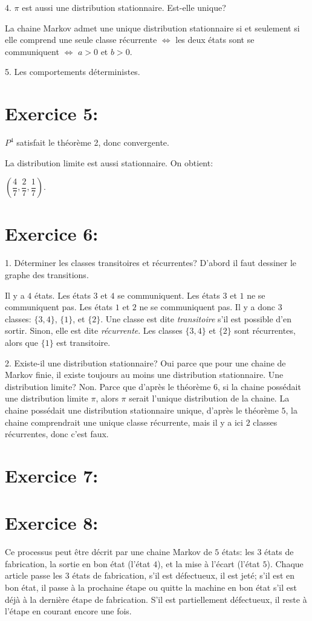 \documentclass[a4paper,twoside,12pt]{article}
\begin{document}
4. $\pi$ est aussi une distribution stationnaire. Est-elle unique?

La chaine Markov admet une unique distribution stationnaire si et seulement si elle comprend une seule classe récurrente $\Leftrightarrow$ les deux états sont se communiquent $\Leftrightarrow$ $a > 0$ et $b > 0$.

5. Les comportements déterministes.

\section{Exercice 5:}
$P^4$ satisfait le théorème 2, donc convergente.

La distribution limite est aussi stationnaire. On obtient:

$\left(\dfrac{4}{7}, \dfrac{2}{7}, \dfrac{1}{7}\right)$.

\section{Exercice 6:}
1. Déterminer les classes transitoires et récurrentes? D'abord il faut dessiner le graphe des transitions.

Il y a $4$ états. Les états $3$ et $4$ se communiquent. Les états $3$ et $1$ ne se communiquent pas. Les états $1$ et $2$ ne se communiquent pas. Il y a donc $3$ classes: $\{3, 4\}$, $\{1\}$, et $\{2\}$. Une classe est dite \textsl{transitoire} s'il est possible d'en sortir. Sinon, elle est dite \textsl{récurrente}. Les classes $\{3, 4\}$ et $\{2\}$ sont récurrentes, alors que $\{1\}$ est transitoire.

2. Existe-il une distribution stationnaire? Oui parce que pour une chaine de Markov finie, il existe toujours au moins une distribution stationnaire. Une distribution limite? Non. Parce que d'après le théorème $6$, si la chaine possédait une distribution limite $\pi$, alors $\pi$ serait l'unique distribution de la chaine. La chaine possédait une distribution stationnaire unique, d'après le théorème $5$, la chaine comprendrait une unique classe récurrente, mais il y a ici $2$ classes récurrentes, donc c'est faux.

\section{Exercice 7:}

\section{Exercice 8:}
Ce processus peut être décrit par une chaine Markov de $5$ états: les $3$ états de fabrication, la sortie en bon état (l'état $4$), et la mise à l'écart (l'état $5$). Chaque article passe les $3$ états de fabrication, s'il est défectueux, il est jeté; s'il est en bon état, il passe à la prochaine étape ou quitte la machine en bon état s'il est déjà à la dernière étape de fabrication. S'il est partiellement défectueux, il reste à l'étape en courant encore une fois.
\end{document}
